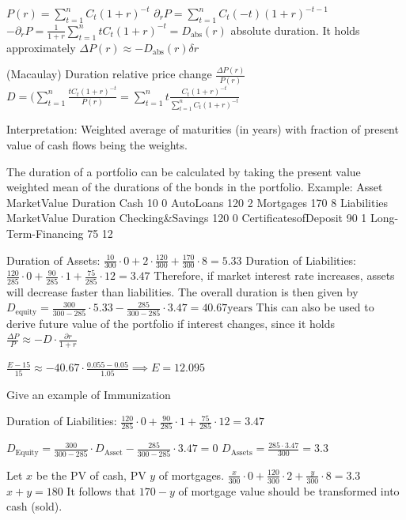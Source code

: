 \( P(r) = \sum_{t=1}^n C_t (1 + r)^{-t} \)
\( \partial_r P = \sum_{t=1}^n C_t (-t)(1 + r)^{-t-1} \)
\( - \partial_r P = \frac{1}{1+r} \sum_{t=1}^n t C_t (1 + r)^{-t} = D_{\text{abs}}(r)\)
absolute duration.
It holds approximately
\( \Delta P(r) \approx - D_{\text{abs}}(r) \delta r \)

(Macaulay) Duration
relative price change \( \frac{\Delta P(r)}{P(r)} \)
\( D = (\sum_{t=1}^n \frac{t C_t(1+r)^{-t}}{P(r)} = \sum_{t=1}^n t \frac{C_t(1+r)^{-t}}{\sum_{t=1}^n C_t(1+r)^{-t}} \)

Interpretation:
Weighted average of maturities (in years) with fraction of
present value of cash flows being the weights.

The duration of a portfolio can be calculated by taking the present
value weighted mean of the durations of the bonds in the portfolio.
Example:
Asset MarketValue Duration
Cash 10 0
AutoLoans 120 2
Mortgages 170 8
Liabilities MarketValue Duration
Checking\&Savings 120 0
CertificatesofDeposit 90 1
Long-Term-Financing 75 12

Duration of Assets:
\( \frac{10}{300}\cdot 0 + 2\cdot\frac{120}{300} + \frac{170}{300}\cdot 8 = 5.33 \)
Duration of Liabilities:
\( \frac{120}{285}\cdot 0 + \frac{90}{285}\cdot 1 + \frac{75}{285}\cdot 12 = 3.47 \)
Therefore, if market interest rate increases, assets will decrease
faster than liabilities.
The overall duration is then given by 
\( D_{\text{equity}} =  \frac{300}{300 - 285}\cdot 5.33 - \frac{285}{300 - 285}\cdot 3.47 = 40.67 \text{years} \)
This can also be used to derive future value of the portfolio if interest changes, since it holds
\( \frac{\Delta P}{P} \approx - D \cdot \frac{\partial r}{1 + r} \)

\( \frac{E - 15}{15} \approx -40.67 \cdot \frac{0.055 - 0.05}{1.05} \implies E = 12.095 \)



Give an example of Immunization 

Duration of Liabilities:
\( \frac{120}{285}\cdot 0 + \frac{90}{285}\cdot 1 + \frac{75}{285}\cdot 12 = 3.47 \)

\( D_{\text{Equity}} = \frac{300}{300 - 285}\cdot D_{\text{Asset}} - \frac{285}{300-285}\cdot 3.47 = 0 \)
\( D_{\text{Assets}} = \frac{285\cdot 3.47}{300} = 3.3 \)

Let \( x \) be the PV of cash, PV \( y \) of mortgages.
\( \frac{x}{300}\cdot 0 + \frac{120}{300} \cdot 2 + \frac{y}{300}\cdot 8 = 3.3 \)
\( x + y = 180 \)
It follows that \( 170 - y \) of mortgage value should be transformed into cash (sold).

